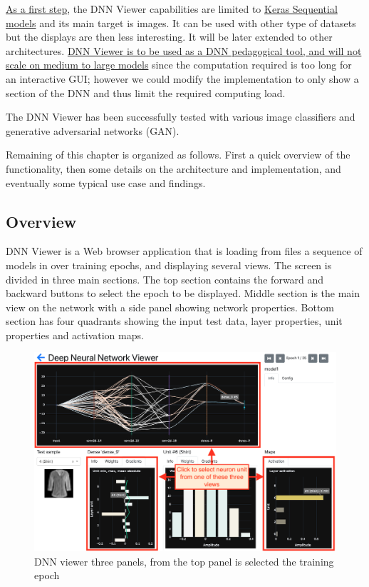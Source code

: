 \ul{As a first step}, 
the DNN Viewer capabilities are limited to \ul{Keras Sequential models} and its main target is images. It can be used with other type of datasets but the displays are then less interesting. 
It will be later extended to other architectures. \ul{DNN Viewer is to be used as a DNN pedagogical tool, and will not scale on medium to large models} since the computation required is too long for an interactive GUI; however we could modify the implementation to only show a section of the DNN and thus limit the required computing load.

The DNN Viewer has been successfully tested with various image classifiers and generative adversarial networks (GAN).

Remaining of this chapter is organized as follows. First a quick overview of the functionality, then some details on the architecture and implementation, and eventually some typical use case and findings.


\subsection{Overview}
\label{dnn-viewer-overview}


DNN Viewer is a Web browser application that is loading from files a sequence of models in over training epochs, and displaying several views. The screen is divided in three main sections. The top section contains the forward and backward buttons to select the epoch to be displayed. Middle section is the main view on the network with a side panel showing network properties. Bottom section has four quadrants showing the input test data, layer properties, unit properties and activation maps.

\begin{figure}[H]
    \centering
    \includegraphics[scale=0.4]{images/dnn-viewer/dnnviewer-selection.png}
    \caption{DNN viewer three panels, from the top panel is selected the training epoch}
    \label{fig:dnn-viewer-top}
\end{figure}

